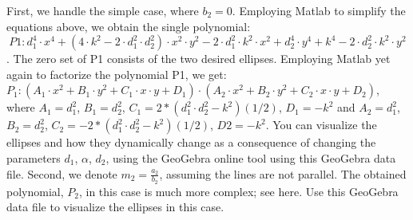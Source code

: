 First, we handle the simple case, where $b_2 = 0$. Employing Matlab to simplify the equations above, we obtain the single polynomial:
$$P1: d_1^4\cdot x^4 + (4\cdot k^2 - 2\cdot d_1^2\cdot d_2^2)\cdot x^2\cdot y^2 - 2\cdot d_1^2\cdot k^2\cdot x^2 + d_2^4\cdot y^4 + k^4 - 2\cdot d_2^2\cdot k^2\cdot y^2$$.
The zero set of P1 consists of the two desired ellipses. Employing Matlab yet again to factorize the polynomial P1, we get: $P_1: (A_1\cdot x^2 + B_1\cdot y^2 + C_1\cdot x\cdot y + D_1)\cdot (A_2\cdot x^2 + B_2\cdot y^2 + C_2\cdot x\cdot y +D_2)$, where $A_1 = d_1^2$, $B_1 = d_2^2$, $C_1 = 2*(d_1^2\cdot d_2^2 - k^2)(1/2)$, $D_1 = -k^2$ and $A_2 = d_1^2$, $B_2 = d_2^2$, $C_2 = -2*(d_1^2\cdot d_2^2 - k^2)(1/2)$, $D2 = -k^2$. You can visualize the ellipses and how they dynamically change as a consequence of changing the parameters $d_1$, $\alpha$, $d_2$, using the GeoGebra online tool using this GeoGebra data file.
Second, we denote $m_2 = \frac{a_2}{b_2}$, assuming the lines are not parallel. The obtained polynomial, $P_2$, in this case is much more complex; see here. Use this GeoGebra data file to visualize the ellipses in this case.
